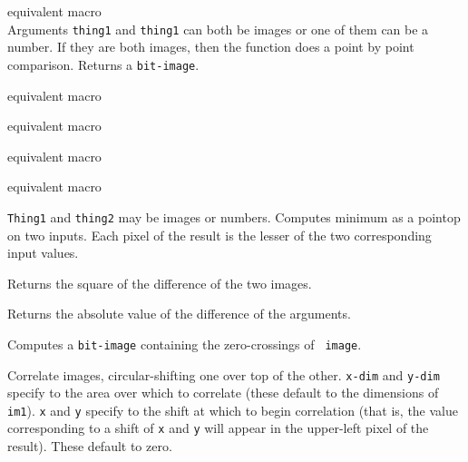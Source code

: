 \begin{description}
\item{}
equivalent macro  \\
Arguments {\tt thing1} and {\tt thing1} can both be images or one of
them can be a number.  If they are both images, then the function does
a point by point comparison.  Returns a {\tt bit-image}.

\item{}
equivalent macro 

\item{}
equivalent macro 

\item{}
equivalent macro 

\item{}
equivalent macro 

\item{}
{\tt Thing1} and {\tt thing2} may be images or numbers.  Computes
minimum as a pointop on two inputs.  Each pixel of the result is the
lesser of the two corresponding input values.

\item{}

\item{}
Returns the square of the difference of the two images.

\item{}
Returns the absolute value of the difference of the arguments.

\item{}
\item{}
\item{}

\item{}
Computes a {\tt bit-image} containing the zero-crossings of {\tt
image}.

\item{}
Correlate images, circular-shifting one over top of the other.
{\tt x-dim} and {\tt y-dim} specify to the area over which to correlate
(these default to the dimensions of {\tt im1}).
{\tt x} and {\tt y} specify to the shift at which to begin correlation
(that is, the value corresponding to a shift of {\tt x} and {\tt y}
will appear in the upper-left pixel of the result). These default to zero.

\end{description}


